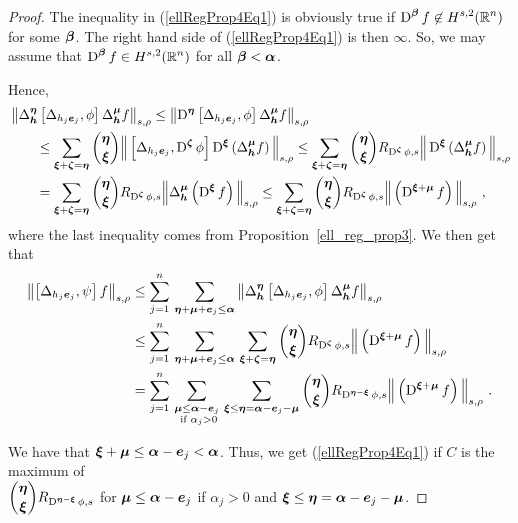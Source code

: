 \begin{proof}
The inequality in (\ref{ellRegProp4Eq1}) is obviously true if
$\displaystyle \operatorname{D}^{{\bm{\beta}}} f \not\in H^{s,2}(\mathbb{R}^n)$ for some
${\bm{\beta}}$.
The right hand side of (\ref{ellRegProp4Eq1}) is then $\infty$.  So, we may
assume that $\displaystyle \operatorname{D}^{{\bm{\beta}}} f \in H^{s,2}(\mathbb{R}^n)$ for all
${\bm{\beta}} < {\bm{\alpha}}$.

Hence,
\begin{align*}
&\left\| \Delta^{{\bm{\eta}}}_{{\bm{h}}} \left[
\Delta_{h_j {\bm{e}}_j}, \phi\right] \Delta^{{\bm{\mu}}}_{{\bm{h}}} f
\right\|_{s,\rho}
\leq \left\| \operatorname{D}^{{\bm{\eta}}} \left[ \Delta_{h_j {\bm{e}}_j}, \phi\right]
\Delta^{{\bm{\mu}}}_{{\bm{h}}} f\right\|_{s,\rho} \\
&\qquad \leq \sum_{{\bm{\xi}}+{\bm{\zeta}} = {\bm{\eta}}}
\binom{{\bm{\eta}}}{{\bm{\xi}}}
\Big\| \left[ \Delta_{h_j{\bm{e}}_j} , \operatorname{D}^{{\bm{\zeta}}} \phi \right]
\operatorname{D}^{{\bm{\xi}}} \left(\Delta^{{\bm{\mu}}}_{{\bm{h}}} f\right) \Big\|_{s,\rho}
\leq \sum_{{\bm{\xi}}+{\bm{\zeta}} = {\bm{\eta}}} \binom{{\bm{\eta}}}{{\bm{\xi}}}
R_{\operatorname{D}^{{\bm{\zeta}}} \phi,s}
\Big\| \operatorname{D}^{{\bm{\xi}}} \left(\Delta^{{\bm{\mu}}}_{{\bm{h}}} f\right)
\Big\|_{s,\rho} \\
&\qquad =\sum_{{\bm{\xi}}+{\bm{\zeta}} = {\bm{\eta}}}
\binom{{\bm{\eta}}}{{\bm{\xi}}} R_{\operatorname{D}^{{\bm{\zeta}}} \phi,s}
\Big\| \Delta^{{\bm{\mu}}}_{{\bm{h}}}
\left(\operatorname{D}^{{\bm{\xi}}} f\right) \Big\|_{s,\rho}
\leq \sum_{{\bm{\xi}}+{\bm{\zeta}} = {\bm{\eta}}} \binom{{\bm{\eta}}}{{\bm{\xi}}}
R_{\operatorname{D}^{{\bm{\zeta}}} \phi,s}
\Big\| \left(\operatorname{D}^{{\bm{\xi}}+{\bm{\mu}}} f\right) \Big\|_{s,\rho} \ ,
\end{align*}
where the last inequality comes from Proposition~\ref{ell_reg_prop3}.
We then get that
\begin{align*}
\left\| \left[ \Delta_{h_j{\bm{e}}_j} ,\psi \right] f \right\|_{s,\rho}
&\leq \sum_{j=1}^n \, \sum_{{\bm{\eta}}+{\bm{\mu}}+{\bm{e}}_j \leq {\bm{\alpha}}}
\left\| \Delta^{{\bm{\eta}}}_{{\bm{h}}} \left[ \Delta_{h_j {\bm{e}}_j},
\phi\right] \Delta^{{\bm{\mu}}}_{{\bm{h}}} f \right\|_{s,\rho} \\
&\leq \sum_{j=1}^n \, \sum_{{\bm{\eta}}+{\bm{\mu}}+{\bm{e}}_j \leq {\bm{\alpha}}} \,
\sum_{{\bm{\xi}}+{\bm{\zeta}} = {\bm{\eta}}} \binom{{\bm{\eta}}}{{\bm{\xi}}}
R_{\operatorname{D}^{{\bm{\zeta}}} \phi,s}
\Big\| \left(\operatorname{D}^{{\bm{\xi}}+{\bm{\mu}}} f\right) \Big\|_{s,\rho} \\
&= \sum_{j=1}^n \, \sum_{\substack{{\bm{\mu}} \leq {\bm{\alpha}} - {\bm{e}}_j \\
\text{ if } \alpha_j >0}} \,
\sum_{{\bm{\xi}} \leq {\bm{\eta}} = {\bm{\alpha}} - {\bm{e}}_j - {\bm{\mu}}}
\binom{{\bm{\eta}}}{{\bm{\xi}}} R_{\operatorname{D}^{{\bm{\eta}}- {\bm{\xi}}} \phi,s}
\Big\| \left(\operatorname{D}^{{\bm{\xi}}+{\bm{\mu}}} f\right) \Big\|_{s,\rho} \ .
\end{align*}

We have that ${\bm{\xi}} + {\bm{\mu}} \leq {\bm{\alpha}} - {\bm{e}}_j <
{\bm{\alpha}}$.  Thus, we get (\ref{ellRegProp4Eq1}) if $C$ is the maximum of\\
$\displaystyle \binom{{\bm{\eta}}}{{\bm{\xi}}}
R_{\operatorname{D}^{{\bm{\eta}} - {\bm{\xi}}} \phi,s}$ for
${\bm{\mu}} \leq {\bm{\alpha}} - {\bm{e}}_j$ if $\alpha_j >0$ and
${\bm{\xi}} \leq {\bm{\eta}} = {\bm{\alpha}} - {\bm{e}}_j - {\bm{\mu}}$.
\end{proof}


